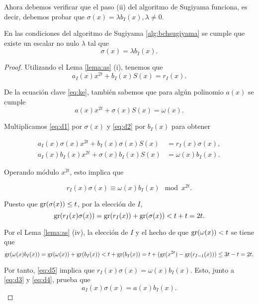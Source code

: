 Ahora debemos verificar que el paso (ii) del algoritmo de Sugiyama funciona, es decir, debemos probar que  $\sigma(x) = \lambda b_I(x), \lambda \neq 0$. 

\begin{teorema} 
En las condiciones del algoritmo de Sugiyama \ref{alg:bchsugiyama} se cumple que existe un escalar no nulo $\lambda$ tal que
$$\sigma(x) = \lambda b_I(x).$$
  
\end{teorema}
\begin{proof}
Utilizando el Lema \ref{lema:as} (i), tenemos que
\begin{equation}\label{eq:d1}
a_I(x)x^{2t} + b_I(x)S(x) = r_I(x).
\end{equation}

De la ecuación clave \eqref{eq:ke}, también sabemos que para algún polinomio $a(x)$ se cumple
\begin{equation}\label{eq:d2}
a(x)x^{2t} + \sigma(x)S(x) = \omega(x).
\end{equation}

Multiplicamos \eqref{eq:d1} por $\sigma(x)$ y \eqref{eq:d2} por $b_I(x)$ para obtener

\begin{align}
    a_I(x)\sigma(x)x^{2t} + b_I(x)\sigma(x)S(x) &= r_I(x)\sigma(x), \label{eq:d3}\\
    a_I(x)b_I(x)x^{2t} + \sigma(x)b_I(x)S(x) &= \omega(x)b_I(x) \label{eq:d4}.
\end{align}

Operando módulo $x^{2t}$, esto implica que 

\begin{equation}\label{eq:d5}
r_I(x)\sigma(x) \equiv \omega(x)b_I(x) \mod x^{2t}.
\end{equation}

Puesto que $\operatorname{gr}(\sigma(x)) \leq t$, por la elección de $I$, $$\operatorname{gr}(r_I(x)\sigma(x)) = \operatorname{gr}(r_I(x)) + \operatorname{gr}(\sigma(x)) < t + t = 2t.$$

Por el Lema \ref{lema:as} (iv), la elección de $I$ y el hecho de que $\operatorname{gr}(\omega(x)) < t$ se tiene que
  $$\operatorname{gr}(\omega(x)b_I(x)) = \operatorname{gr}(\omega(x)) + \operatorname{gr}(b_I(x))  \\
  < t + \operatorname{gr}(b_I(x)) = t + (\operatorname{gr}(x^{2t}) - \operatorname{gr}(r_{I-1}(x))) \leq 3t - t = 2t.$$

Por tanto, \eqref{eq:d5} implica que $r_I(x)\sigma(x) = \omega(x)b_I(x)$. Esto, junto a \eqref{eq:d3} y \eqref{eq:d4}, prueba que
\begin{equation}\label{eq:d6}
  a_I(x)\sigma(x) = a(x)b_I(x).
\end{equation}


\end{proof}
